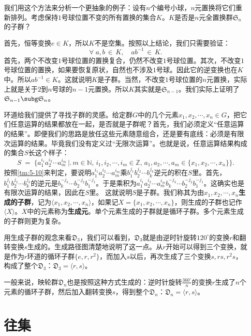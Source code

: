 \documentclass[12pt,UTF8,fontset=none]{ctexbook}
\begin{document}
我们用这个方法来分析一个更抽象的例子：设有$n$个编号小球，$n$元置换将它们重新排列。考虑保持$1$号球位置不变的所有置换的集合$K$。$K$是否是$n$元全置换群$\mathfrak{S}_n$的子群？

首先，恒等变换$e\in K$，所以$K$不是空集。按照以上结论，我们只需要验证：
\[
\forall\; a,b\,\in\,K,\quad ab^{-1} \,\in\,K.
\]
首先，两个不改变$1$号球位置的置换复合，仍然不改变$1$号球位置。其次，不改变$1$号球位置的置换，如果要恢复原状，自然也不涉及$1$号球。因此它的逆变换也在$K$中。所以$ab^{-1}\in K$。这就说明$K$是子群。当然，不改变$1$号球位置的$n$元置换，实际上就是关于$2$到$n$号球的$n-1$元置换。所以$K$其实就是$\mathfrak{S}_{n-1}$。我们实际上证明了$\mathfrak{S}_{n-1}\subg\mathfrak{S}_n$。

环道给我们提供了寻找子群的灵感。给定群$G$中的几个元素$x_1,x_2,\cdots,x_n\in G$，把它们任意运算的结果都放在一起，是否就是子群呢？首先，我们必须定义“任意运算的结果”。即便我们的思路是放任这些元素随意组合，还是要有底线：必须是有限次运算的结果。毕竟我们没有定义过“无限次运算”。也就是说，任意运算结果构成的集合$S$长这个样子：
\[
    S \;=\;\big\{a_1^{i_1}a_2^{i_2}\cdots a_m^{i_m}\,\big|\big.\,m\in\mathbb{N},\,i_1,i_2,\cdots,i_m\in\mathbb{Z},\,a_1,a_2,\cdots,a_m\in \{x_1,x_2,\cdots,x_n\}\big\}.
\]
按照\ref{tm:5-10}来判定，要说明$a_1^{i_1}a_2^{i_2}\cdots a_m^{i_m}$乘$b_1^{j_1}b_2^{j_2}\cdots b_k^{j_k}$逆元的积在$S$里。首先，$b_1^{j_1}b_2^{j_2}\cdots b_k^{j_k}$的逆元是$b_k^{-j_k}\cdots b_2^{-j_2} b_1^{-j_1}$。于是乘积为$a_1^{i_1}a_2^{i_2}\cdots a_m^{i_m}b_k^{-j_k}\cdots b_2^{-j_2} b_1^{-j_1}$。这确实也是有限次运算的结果，因此在$S$里。
这就说明$S$是子群。我们称其为由$x_1,x_2,\cdots,x_n$\textbf{生成的子群}，记为$\langle x_1,x_2,\cdots,x_n\rangle$，如果记$X=\{x_1,x_2,\cdots,x_n\}$，则生成的子群也记作$\langle X\rangle$。$X$中的元素称为\textbf{生成元}。单个元素生成的子群就是循环子群。多个元素生成的子群则更为复杂。

用生成子群的观念来看$\mathfrak{D}_3$，我们可以看到，$\mathfrak{D}_3$就是由逆时针旋转$120^\circ$的变换$r$和翻转变换$s$生成的。生成路径图清楚地说明了这一点。从$r$开始可以得到三个变换，就是作为$r$环道的循环子群$\{e,r,r^2\}$，而加入$s$以后，再次生成了三个变换$s,rs,r^2s$，构成了整个$\mathfrak{D}_3$：$\mathfrak{D}_3 = \langle r,s\rangle$。

一般来说，映轮群$\mathfrak{D}_n$也是按照这种方式生成的：逆时针旋转$\frac{360^\circ}{n}$的变换$r$生成了$n$个元素的循环子群，然后加入翻转变换$s$，得到整个$\mathfrak{D}_n$：$\mathfrak{D}_n=\langle r,s\rangle$。

\section{往集}
\end{document}
